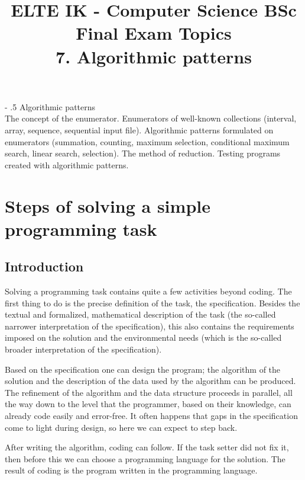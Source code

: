 \documentclass[margin=0px]{article}
\title{\textbf{{\Large ELTE IK - Computer Science BSc} \vspace{0.2cm} \\ {\huge Final Exam Topics}} \vspace{0.3cm} \\ 7. Algorithmic patterns}
\author{}
\date{}
\makeatletter
\newenvironment{tetel}[1]{\paragraph{#1 \\}}{}
\renewcommand\paragraph{%
	\@startsection{paragraph}{4}{0mm}%
	{-\baselineskip}%
	{.5\baselineskip}%
	{\normalfont\normalsize\bfseries}}
\makeatother
\begin{document}
\maketitle

\begin{center}
\end{center}

\begin{tetel}{Algorithmic patterns}
    The concept of the enumerator. Enumerators of well-known collections (interval, array, sequence, sequential input file). Algorithmic patterns formulated on enumerators (summation, counting, maximum selection, conditional maximum search, linear search, selection). The method of reduction. Testing programs created with algorithmic patterns.
\end{tetel}

\section{Steps of solving a simple programming task}
\subsection{Introduction}
Solving a programming task contains quite a few activities beyond coding.
The first thing to do is the precise definition of the task, the specification. Besides the textual and formalized, mathematical description of the task (the so-called narrower interpretation of the specification), this also contains the requirements imposed on the solution and the environmental needs (which is the so-called broader interpretation of the specification).

Based on the specification one can design the program; the algorithm of the solution and the description of the data used by the algorithm can be produced. The refinement of the algorithm and the data structure proceeds in parallel, all the way down to the level that the programmer, based on their knowledge, can already code easily and error-free. It often happens that gaps in the specification come to light during design, so here we can expect to step back.

After writing the algorithm, coding can follow. If the task setter did not fix it, then before this we can choose a programming language for the solution. The result of coding is the program written in the programming language.
\end{document}
